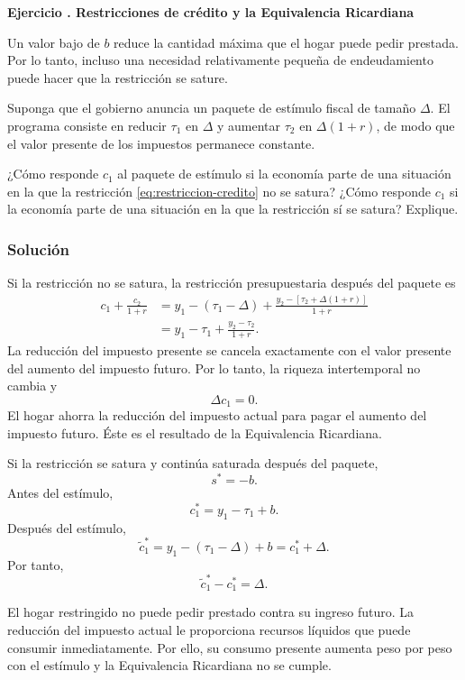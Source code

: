 \documentclass[11pt]{article}
\let\enumerateoriginal\enumerate
\let\endenumerateoriginal\endenumerate
\renewenvironment{enumerate}{%
  \enumerateoriginal
  \setlength{\itemsep}{0.5em}%
  \setlength{\parsep}{0pt}%
  \setlength{\topsep}{0.4em}%
}{\endenumerateoriginal}
\newcounter{problema}
\newenvironment{problema}[1]{%
  \par
  \refstepcounter{problema}%
  \addvspace{0.9em}%
  \noindent\textbf{Ejercicio \theproblema. #1}
  \par\nobreak\smallskip
}{\par}
\begin{document}
\begin{problema}{Restricciones de crédito y la Equivalencia Ricardiana}
\begin{enumerate}
\begin{enumerate}
\item Un valor bajo de \(b\) reduce la cantidad máxima que el hogar puede pedir prestada. Por lo tanto, incluso una necesidad relativamente pequeña de endeudamiento puede hacer que la restricción se sature.

\end{enumerate}

\item Suponga que el gobierno anuncia un paquete de estímulo fiscal de tamaño \(\Delta\). El programa consiste en reducir \(\tau_1\) en \(\Delta\) y aumentar \(\tau_2\) en \(\Delta(1+r)\), de modo que el valor presente de los impuestos permanece constante.

¿Cómo responde \(c_1\) al paquete de estímulo si la economía parte de una situación en la que la restricción \eqref{eq:restriccion-credito} no se satura? ¿Cómo responde \(c_1\) si la economía parte de una situación en la que la restricción sí se satura? Explique.

\subsubsection*{Solución}

Si la restricción no se satura, la restricción presupuestaria después del paquete es
\begin{align*}
  c_1+\frac{c_2}{1+r}
  &=
  y_1-(\tau_1-\Delta)
  +
  \frac{y_2-\left[\tau_2+\Delta(1+r)\right]}{1+r}
  \\
  &=
  y_1-\tau_1
  +
  \frac{y_2-\tau_2}{1+r}.
\end{align*}
La reducción del impuesto presente se cancela exactamente con el valor presente del aumento del impuesto futuro. Por lo tanto, la riqueza intertemporal no cambia y
\[
  \boxed{\Delta c_1=0}.
\]
El hogar ahorra la reducción del impuesto actual para pagar el aumento del impuesto futuro. Éste es el resultado de la Equivalencia Ricardiana.

Si la restricción se satura y continúa saturada después del paquete,
\[
  s^*=-b.
\]
Antes del estímulo,
\[
  c_1^*=y_1-\tau_1+b.
\]
Después del estímulo,
\[
  \widetilde c_1^*
  =
  y_1-(\tau_1-\Delta)+b
  =
  c_1^*+\Delta.
\]
Por tanto,
\[
  \boxed{
    \widetilde c_1^*-c_1^*=\Delta
  }.
\]

El hogar restringido no puede pedir prestado contra su ingreso futuro. La reducción del impuesto actual le proporciona recursos líquidos que puede consumir inmediatamente. Por ello, su consumo presente aumenta peso por peso con el estímulo y la Equivalencia Ricardiana no se cumple.


\end{enumerate}

\end{problema}
\end{document}

